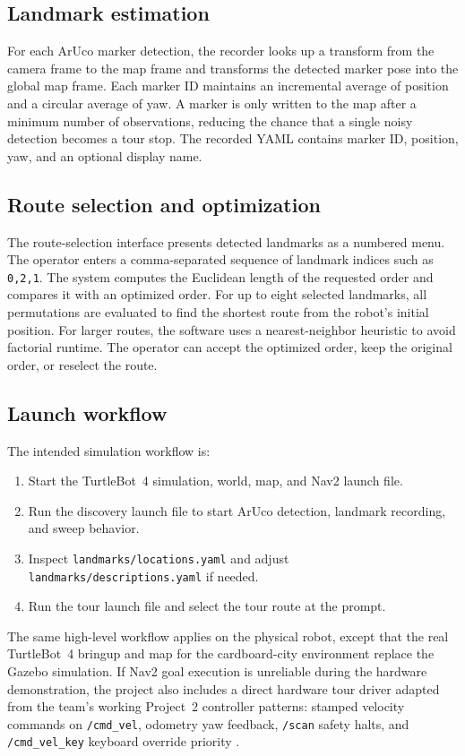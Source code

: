 \documentclass[12pt]{article}
\begin{document}
\subsection*{Landmark estimation}
For each ArUco marker detection, the recorder looks up a transform from the camera frame to the map frame and transforms the detected marker pose into the global map frame. Each marker ID maintains an incremental average of position and a circular average of yaw. A marker is only written to the map after a minimum number of observations, reducing the chance that a single noisy detection becomes a tour stop. The recorded YAML contains marker ID, position, yaw, and an optional display name.

\subsection*{Route selection and optimization}
The route-selection interface presents detected landmarks as a numbered menu. The operator enters a comma-separated sequence of landmark indices such as \texttt{0,2,1}. The system computes the Euclidean length of the requested order and compares it with an optimized order. For up to eight selected landmarks, all permutations are evaluated to find the shortest route from the robot's initial position. For larger routes, the software uses a nearest-neighbor heuristic to avoid factorial runtime. The operator can accept the optimized order, keep the original order, or reselect the route.

\subsection*{Launch workflow}
The intended simulation workflow is:
\begin{enumerate}
    \item Start the TurtleBot~4 simulation, world, map, and Nav2 launch file.
    \item Run the discovery launch file to start ArUco detection, landmark recording, and sweep behavior.
    \item Inspect \texttt{landmarks/locations.yaml} and adjust \texttt{landmarks/descriptions.yaml} if needed.
    \item Run the tour launch file and select the tour route at the prompt.
\end{enumerate}
The same high-level workflow applies on the physical robot, except that the real TurtleBot~4 bringup and map for the cardboard-city environment replace the Gazebo simulation. If Nav2 goal execution is unreliable during the hardware demonstration, the project also includes a direct hardware tour driver adapted from the team's working Project~2 controller patterns: stamped velocity commands on \texttt{/cmd\_vel}, odometry yaw feedback, \texttt{/scan} safety halts, and \texttt{/cmd\_vel\_key} keyboard override priority \cite{project2_controller}.
\end{document}
